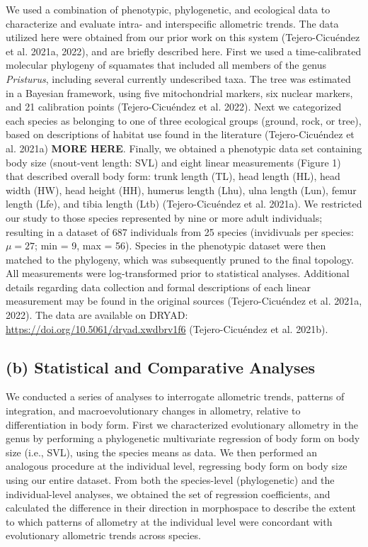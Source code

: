 \documentclass[
  11pt,
]{article}
\begin{document}
We used a combination of phenotypic, phylogenetic, and ecological data
to characterize and evaluate intra- and interspecific allometric trends.
The data utilized here were obtained from our prior work on this system
(Tejero-Cicuéndez et al. 2021a, 2022), and are briefly described here.
First we used a time-calibrated molecular phylogeny of squamates that
included all members of the genus \emph{Pristurus}, including several
currently undescribed taxa. The tree was estimated in a Bayesian
framework, using five mitochondrial markers, six nuclear markers, and 21
calibration points (Tejero-Cicuéndez et al. 2022). Next we categorized
each species as belonging to one of three ecological groups (ground,
rock, or tree), based on descriptions of habitat use found in the
literature (Tejero-Cicuéndez et al. 2021a) \textbf{MORE HERE}. Finally,
we obtained a phenotypic data set containing body size (snout-vent
length: SVL) and eight linear measurements (Figure 1) that described
overall body form: trunk length (TL), head length (HL), head width (HW),
head height (HH), humerus length (Lhu), ulna length (Lun), femur length
(Lfe), and tibia length (Ltb) (Tejero-Cicuéndez et al. 2021a). We
restricted our study to those species represented by nine or more adult
individuals; resulting in a dataset of 687 individuals from 25 species
(invidivuals per species: \(\mu=27\); min = 9, max = 56). Species in the
phenotypic dataset were then matched to the phylogeny, which was
subsequently pruned to the final topology. All measurements were
log-transformed prior to statistical analyses. Additional details
regarding data collection and formal descriptions of each linear
measurement may be found in the original sources (Tejero-Cicuéndez et
al. 2021a, 2022). The data are available on DRYAD:
\url{https://doi.org/10.5061/dryad.xwdbrv1f6} (Tejero-Cicuéndez et al.
2021b).

\hypertarget{b-statistical-and-comparative-analyses}{%
\subsection{(b) Statistical and Comparative
Analyses}\label{b-statistical-and-comparative-analyses}}

We conducted a series of analyses to interrogate allometric trends,
patterns of integration, and macroevolutionary changes in allometry,
relative to differentiation in body form. First we characterized
evolutionary allometry in the genus by performing a phylogenetic
multivariate regression of body form on body size (i.e., SVL), using the
species means as data. We then performed an analogous procedure at the
individual level, regressing body form on body size using our entire
dataset. From both the species-level (phylogenetic) and the
individual-level analyses, we obtained the set of regression
coefficients, and calculated the difference in their direction in
morphospace to describe the extent to which patterns of allometry at the
individual level were concordant with evolutionary allometric trends
across species. \hfill\break
\end{document}
